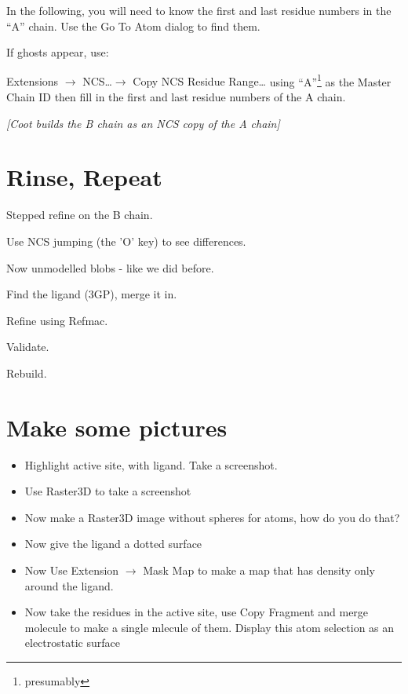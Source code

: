 \documentclass{article}
\begin{document}
In the following, you will need to know the first and last residue
numbers in the ``A'' chain.  Use the Go To Atom dialog to find them.

If ghosts appear, use:

\textsf{Extensions $\rightarrow$ NCS\ldots $\rightarrow$ Copy NCS
  Residue Range\ldots} using ``A''\footnote{presumably} as the Master
Chain ID then fill in the first and last residue numbers of the A
chain.

\textsl{[Coot builds the B chain as an NCS copy of the A chain]}

\section{Rinse, Repeat}

\begin{trivlist}
\item Stepped refine on the B chain.

  Use NCS jumping (the 'O' key) to see differences.
\item Now unmodelled blobs - like we did before.
\item Find the ligand (3GP), merge it in.
\item Refine using Refmac.
\item Validate. 
\item Rebuild.
\end{trivlist}


\section{Make some pictures}


  \begin{itemize}
    \item Highlight active site, with ligand.  Take a screenshot.
    \item Use Raster3D to take a screenshot
    \item Now make a Raster3D image without spheres for atoms, how do
      you do that?
    \item Now give the ligand a dotted surface
    \item Now Use \textsf{Extension $\rightarrow$ Mask Map} to make a
      map that has density only around the ligand.
    \item Now take the residues in the active site, use Copy Fragment
      and merge molecule to make a single mlecule of them. Display
      this atom selection as an electrostatic surface
  \end{itemize}
\end{document}
